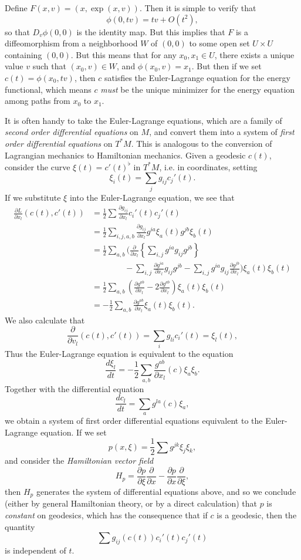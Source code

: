 Define $F(x,v) = (x, \exp(x,v))$. Then it is simple to verify that
%
\[ \phi(0,tv) = tv + O(t^2), \]
%
so that $D_v \phi(0,0)$ is the identity map. But this implies that $F$ is a diffeomorphism from a neighborhood $W$ of $(0,0)$ to some open set $U \times U$ containing $(0,0)$. But this means that for any $x_0, x_1 \in U$, there exists a unique value $v$ such that $(x_0,v) \in W$, and $\phi(x_0, v) = x_1$. But then if we set $c(t) = \phi(x_0,tv)$, then $c$ satisfies the Euler-Lagrange equation for the energy functional, which means $c$ \emph{must} be the unique minimizer for the energy equation among paths from $x_0$ to $x_1$.

It is often handy to take the Euler-Lagrange equations, which are a family of \emph{second order differential equations} on $M$, and convert them into a system of \emph{first order differential equations} on $T^* M$. This is analogous to the conversion of Lagrangian mechanics to Hamiltonian mechanics. Given a geodesic $c(t)$, consider the curve $\xi(t) = c'(t)^\flat$ in $T^* M$, i.e. in coordinates, setting
%
\[ \xi_i(t) = \sum_j g_{ij} c_j'(t). \]
%
If we substitute $\xi$ into the Euler-Lagrange equation, we see that
%
\begin{align*}
    \frac{\partial L}{\partial x_l}(c(t), c'(t)) &= \frac{1}{2} \sum \frac{\partial g_{ij}}{\partial x_l} c_i'(t) c_j'(t)\\
&= \frac{1}{2} \sum_{i,j,a,b} \frac{\partial g_{ij}}{\partial x_l} g^{ia} \xi_a(t) g^{jb} \xi_b(t)\\
&= \frac{1}{2} \sum_{a,b} \Bigg( \frac{\partial}{\partial x_l} \left\{ \sum_{i,j} g^{ia} g_{ij} g^{jb} \right\}\\
&\quad\quad\quad\quad - \sum_{i,j} \frac{\partial g^{ia}}{\partial x_l} g_{ij} g^{jb} - \sum_{i,j} g^{ia} g_{ij} \frac{\partial g^{jb}}{\partial x_l} \Bigg) \xi_a(t) \xi_b(t)\\
&= \frac{1}{2} \sum_{a,b} \left( \frac{\partial g^{ab}}{\partial x_l} - 2 \frac{\partial g^{ab}}{\partial x_l} \right) \xi_a(t) \xi_b(t)\\
&= - \frac{1}{2} \sum_{a,b} \frac{\partial g^{ab}}{\partial x_l} \xi_a(t) \xi_b(t).
\end{align*}
%
We also calculate that
%
\[ \frac{\partial}{\partial v_l}(c(t), c'(t)) = \sum_i g_{li} c_i'(t) = \xi_l(t), \]
%
Thus the Euler-Lagrange equation is equivalent to the equation
%
\[ \frac{d\xi_l}{dt} = - \frac{1}{2} \sum_{a,b} \frac{g^{ab}}{\partial x_l}(c) \xi_a \xi_b. \]
%
Together with the differential equation
%
\[ \frac{dc_l}{dt} = \sum_a g^{la}(c) \xi_a, \]
%
we obtain a system of first order differential equations equivalent to the Euler-Lagrange equation. If we set
%
\[ p(x,\xi) = \frac{1}{2} \sum g^{jk} \xi_j \xi_k, \]
%
and consider the \emph{Hamiltonian vector field}
%
\[ H_p = \frac{\partial p}{\partial \xi} \frac{\partial}{\partial x} - \frac{\partial p}{\partial x} \frac{\partial}{\partial \xi}, \]
%
then $H_p$ generates the system of differential equations above, and so we conclude (either by general Hamiltonian theory, or by a direct calculation) that $p$ is \emph{constant} on geodesics, which has the consequence that if $c$ is a geodesic, then the quantity
%
\[ \sum g_{ij}(c(t)) c_i'(t) c_j'(t) \]
%
is independent of $t$.

